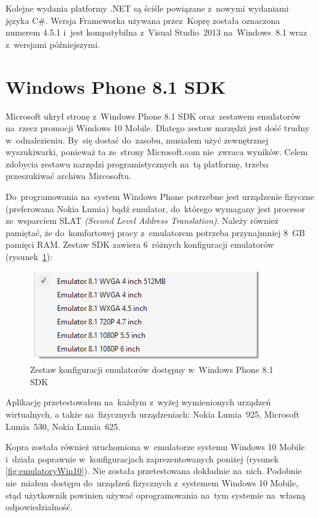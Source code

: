 \documentclass[a4paper,twoside,titlepage,openright]{book}
\begin{document}
Kolejne wydania platformy .NET są ściśle powiązane z~nowymi wydaniami języka C\#. Wersja Frameworka używana przez~Koprę została oznaczona numerem 4.5.1 i~jest kompatybilna z~Visual Studio~2013 na~Windows~8.1 wraz z~wersjami późniejszymi. 


\section{Windows Phone 8.1 SDK}
Microsoft ukrył stronę z~Windows Phone 8.1 SDK oraz~zestawem emulatorów na~rzecz promocji Windows 10 Mobile. Dlatego zestaw narzędzi jest dość trudny w~odnalezieniu. By~się dostać do~zasobu, musiałem użyć zewnętrznej wyszukiwarki, ponieważ ta ze~strony Microsoft.com nie~zwraca wyników. Celem zdobycia zestawu narzędzi programistycznych na~tą platformę, trzeba przeszukiwać archiwa Mircosoftu. \cite{tajneArchiwaMicrosoftu} 

Do~programowania na~system Windows Phone potrzebne jest urządzenie fizyczne (preferowana Nokia Lumia) bądź emulator, do~którego wymagany jest procesor ze~wsparciem SLAT \textit{(Second Level Address Translation)}. Należy również pamiętać, że do~komfortowej pracy z~emulatorem potrzeba przynajmniej 8~GB pamięci RAM. Zestaw SDK zawiera 6~różnych konfiguracji emulatorów (rysunek~\ref{fig:emulatory}): 

\begin{figure}[h]
	\centering
			\includegraphics[resolution=120]{emulatory.png}
		\caption{Zestaw konfiguracji emulatorów dostępny w~Windows Phone 8.1 SDK}
		\label{fig:emulatory}
\end{figure}

Aplikację przetestowałem na~każdym z~wyżej wymienionych urządzeń wirtualnych, a także na~fizycznych urządzeniach: Nokia Lumia~925, Microsoft Lumia~530, Nokia Lumia~625.

Kopra została również uruchomiona w~emulatorze systemu Windows 10 Mobile i~działa poprawnie w~konfiguracjach zaprezentowanych poniżej (rysunek \ref{fig:emulatoryWin10}). Nie została przetestowana dokładnie na~nich. Podobnie nie~miałem dostępu do~urządzeń fizycznych z~systemem Windows 10 Mobile, stąd użytkownik powinien używać oprogramowania na~tym systemie na~własną odpowiedzialność.
\end{document}

